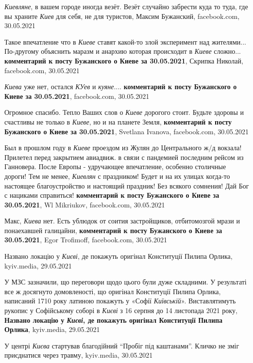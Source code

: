\emph{Киевляне}, в вашем городе иногда везёт.  Везёт случайно забрести куда то
туда, где вы храните \emph{Киев} для себя, не для туристов, Максим Бужанский,
facebook.com, 30.05.2021

Такое впечатление что в \emph{Киеве} ставят какой-то злой эксперимент над
жителями...  По-другому объяснить маразм и анархию которая происходит в
\emph{Киеве} сложно...  \textbf{комментарий к посту Бужанского о Киеве за
30.05.2021}, Скрипка Николай, facebook.com, 30.05.2021

\emph{Киева} уже нет, остался \emph{КУев} и \emph{куяне}....
\textbf{комментарий к посту Бужанского о Киеве за 30.05.2021}, facebook.com,
30.05.2021

Огромное спасибо. Тепло Ваших слов о \emph{Киеве} дорогого стоит. Будьте
здоровы и счастливы не только в \emph{Киеве}, но и на планете Земля,
\textbf{комментарий к посту Бужанского о Киеве за 30.05.2021}, Svetlana
Ivanova, facebook.com, 30.05.2021

Был в прошлом году в \emph{Киеве} проездом из Жулян до Центрального ж/д
вокзала!  Прилетел перед закрытием авиадвиж. в связи с пандемией последним
рейсом из Ганновера. После Европы - удручающее впечатление, особенно столичные
дороги!  Тем не менее, \emph{Киевлян} с праздником! Будет и на их улицах
когда-то настоящее благоустройство и настоящий праздник!  Без всякого сомнения!
Дай Бог с нациками справиться! \textbf{комментарий к посту Бужанского о Киеве
за 30.05.2021}, Wl Mikriukov, facebook.com, 30.05.2021

Макс, \emph{Киева} нет. Есть ублюдок от соития застройщиков, отбитомозгой мрази
и понаехавшей галицайни, \textbf{комментарий к посту Бужанского о Киеве за
30.05.2021}, Egor Trofimoff, facebook.com, 30.05.2021

Названо локацію у \emph{Києві}, де покажуть оригінал Конституції Пилипа Орлика,
kyiv.media, 29.05.2021

У МЗС зазначили, що переговори щодо цього були дуже складними. У результаті все
ж досягнуто домовленості, що оригінал Конституції Пилипа Орлика, написаний 1710
року латиною покажуть у «Софії \emph{Київській}».  Виставлятимуть рукопис  у
Софійському соборі в \emph{Києві} з 16 серпня до 14 листопада 2021 року,
\textbf{Названо локацію у \emph{Києві}, де покажуть оригінал Конституції Пилипа
Орлика}, kyiv.media, 29.05.2021

У центрі \emph{Києва} стартував благодійний \enquote{Пробіг під каштанами}.
Кличко не зміг приєднатися через травму, kyiv.media, 30.05.2021

